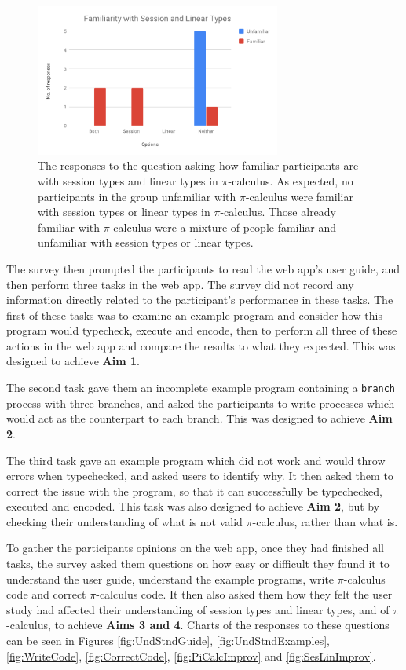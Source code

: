 \documentclass{l4proj}
\begin{document}
\begin{figure}[H]
\centering
\includegraphics[width=0.72\textwidth]{images/SesLinFamiliar.pdf}
\caption{The responses to the question asking how familiar participants are with session types and linear types in $\pi$-calculus. As expected, no participants in the group unfamiliar with $\pi$-calculus were familiar with session types or linear types in $\pi$-calculus. Those already familiar with $\pi$-calculus were a mixture of people familiar and unfamiliar with session types or linear types.}
\label{fig:fmlrSesLin}
\end{figure}

\quad The survey then prompted the participants to read the web app's user guide, and then perform three tasks in the web app. The survey did not record any information directly related to the participant's performance in these tasks. The first of these tasks was to examine an example program and consider how this program would typecheck, execute and encode, then to perform all three of these actions in the web app and compare the results to what they expected. This was designed to achieve \textbf{Aim 1}. 

\quad The second task gave them an incomplete example program containing a \texttt{branch} process with three branches, and asked the participants to write processes which would act as the counterpart to each branch. This was designed to achieve \textbf{Aim 2}. 

\quad The third task gave an example program which did not work and would throw errors when typechecked, and asked users to identify why. It then asked them to correct the issue with the program, so that it can successfully be typechecked, executed and encoded. This task was also designed to achieve \textbf{Aim 2}, but by checking their understanding of what is not valid $\pi$-calculus, rather than what is.

\quad To gather the participants opinions on the web app, once they had finished all tasks, the survey asked them questions on how easy or difficult they found it to understand the user guide, understand the example programs, write $\pi$-calculus code and correct $\pi$-calculus code. It then also asked them how they felt the user study had affected their understanding of session types and linear types, and of $\pi$-calculus, to achieve \textbf{Aims 3 and 4}. Charts of the responses to these questions can be seen in Figures \ref{fig:UndStndGuide}, \ref{fig:UndStndExamples}, \ref{fig:WriteCode}, \ref{fig:CorrectCode}, \ref{fig:PiCalcImprov} and \ref{fig:SesLinImprov}. 
\end{document}
